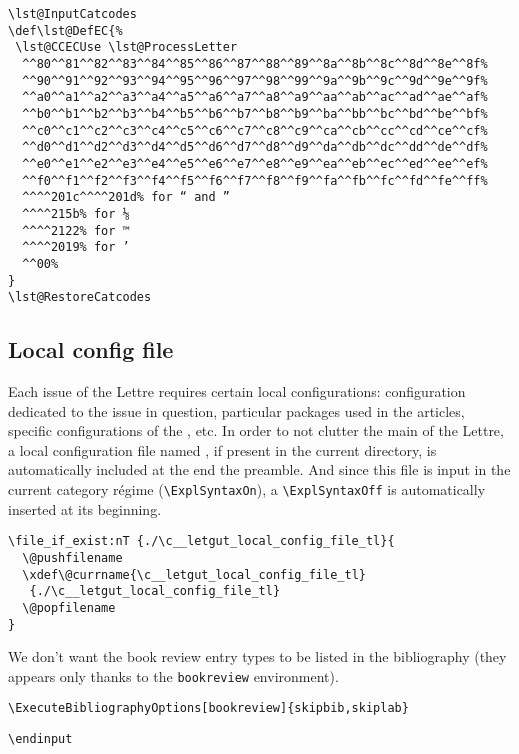 \documentclass{letgut}
\begin{document}
\begin{lstlisting}
\lst@InputCatcodes
\def\lst@DefEC{%
 \lst@CCECUse \lst@ProcessLetter
  ^^80^^81^^82^^83^^84^^85^^86^^87^^88^^89^^8a^^8b^^8c^^8d^^8e^^8f%
  ^^90^^91^^92^^93^^94^^95^^96^^97^^98^^99^^9a^^9b^^9c^^9d^^9e^^9f%
  ^^a0^^a1^^a2^^a3^^a4^^a5^^a6^^a7^^a8^^a9^^aa^^ab^^ac^^ad^^ae^^af%
  ^^b0^^b1^^b2^^b3^^b4^^b5^^b6^^b7^^b8^^b9^^ba^^bb^^bc^^bd^^be^^bf%
  ^^c0^^c1^^c2^^c3^^c4^^c5^^c6^^c7^^c8^^c9^^ca^^cb^^cc^^cd^^ce^^cf%
  ^^d0^^d1^^d2^^d3^^d4^^d5^^d6^^d7^^d8^^d9^^da^^db^^dc^^dd^^de^^df%
  ^^e0^^e1^^e2^^e3^^e4^^e5^^e6^^e7^^e8^^e9^^ea^^eb^^ec^^ed^^ee^^ef%
  ^^f0^^f1^^f2^^f3^^f4^^f5^^f6^^f7^^f8^^f9^^fa^^fb^^fc^^fd^^fe^^ff%
  ^^^^201c^^^^201d% for “ and ”
  ^^^^215b% for ⅛
  ^^^^2122% for ™
  ^^^^2019% for ’
  ^^00%
}
\lst@RestoreCatcodes
\end{lstlisting}

\subsection{Local config file}
\label{ImplementationLocalconfigfile-me7h55h0jlj0}
Each issue of the Lettre requires certain local configurations: configuration
dedicated to the issue in question, particular packages used in the articles,
specific configurations of the , etc. In order to not clutter
the main  of the Lettre, a local configuration file named
, if present in the current directory, is automatically
included at the end the preamble. And since this file is input in the current
category régime (\lstinline+\ExplSyntaxOn+), a \lstinline+\ExplSyntaxOff+ is automatically inserted
at its beginning.

\begin{lstlisting}
\file_if_exist:nT {./\c__letgut_local_config_file_tl}{
  \@pushfilename
  \xdef\@currname{\c__letgut_local_config_file_tl}
   {./\c__letgut_local_config_file_tl}
  \@popfilename
}
\end{lstlisting}

We don't want the book review entry types to be listed in the bibliography
(they appears only thanks to the \lstinline+bookreview+ environment).

\begin{lstlisting}
\ExecuteBibliographyOptions[bookreview]{skipbib,skiplab}
\end{lstlisting}

\begin{lstlisting}
\endinput
\end{lstlisting}
\end{document}
